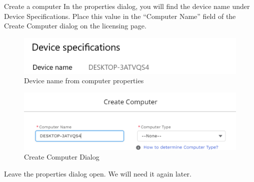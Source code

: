 \documentclass[fleqn]{beamer}
\newcommand{\quotes}[1]{``#1''}
\begin{document}
\begin{frame}{Create a computer}
    In the properties dialog, you will find the device name under Device Specifications. Place this value in the \quotes{Computer Name} field of the Create Computer dialog on the licensing page.
    \begin{multicols}{2}
        \begin{figure}
            \centering
            \includegraphics[scale=.4]{figures/devicename.png}
            \caption{Device name from computer properties}
            \label{fig:my_label}
        \end{figure}
        \begin{figure}
            \centering
            \includegraphics[scale=.3]{figures/ccmenucpuname.png}
            \caption{Create Computer Dialog}
            \label{fig:my_label}
        \end{figure}
    \end{multicols}
    Leave the properties dialog open. We will need it again later.
\end{frame}
\end{document}
